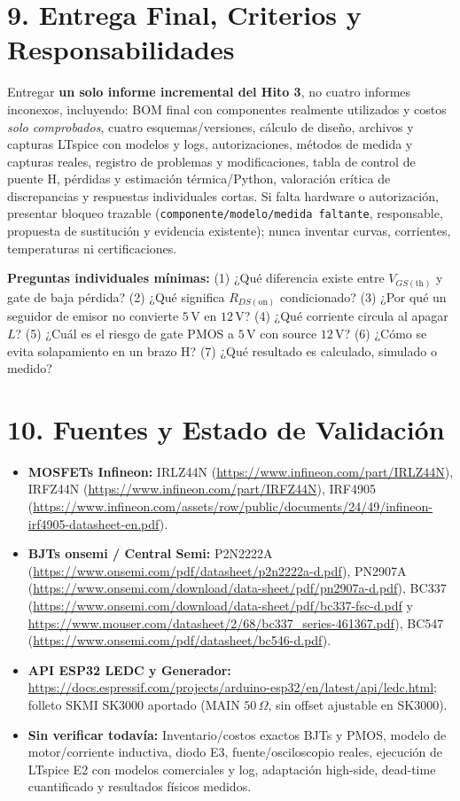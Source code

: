 \documentclass[10pt, a4paper, landscape]{article}
\begin{document}
\section*{9. Entrega Final, Criterios y Responsabilidades}
Entregar \textbf{un solo informe incremental del Hito 3}, no cuatro informes inconexos, incluyendo: BOM final con componentes realmente utilizados y costos \textit{solo comprobados}, cuatro esquemas/versiones, cálculo de diseño, archivos y capturas LTspice con modelos y logs, autorizaciones, métodos de medida y capturas reales, registro de problemas y modificaciones, tabla de control de puente H, pérdidas y estimación térmica/Python, valoración crítica de discrepancias y respuestas individuales cortas. Si falta hardware o autorización, presentar bloqueo trazable (\texttt{componente/modelo/medida faltante}, responsable, propuesta de sustitución y evidencia existente); nunca inventar curvas, corrientes, temperaturas ni certificaciones.

\noindent\textbf{Preguntas individuales mínimas:} (1) ¿Qué diferencia existe entre $V_{GS(\text{th})}$ y gate de baja pérdida? (2) ¿Qué significa $R_{DS(\text{on})}$ condicionado? (3) ¿Por qué un seguidor de emisor no convierte $5\,\text{V}$ en $12\,\text{V}$? (4) ¿Qué corriente circula al apagar $L$? (5) ¿Cuál es el riesgo de gate PMOS a $5\,\text{V}$ con source $12\,\text{V}$? (6) ¿Cómo se evita solapamiento en un brazo H? (7) ¿Qué resultado es calculado, simulado o medido?

\section*{10. Fuentes y Estado de Validación}
\begin{itemize}[noitemsep, topsep=2pt]
    \item \textbf{MOSFETs Infineon:} IRLZ44N (\url{https://www.infineon.com/part/IRLZ44N}), IRFZ44N (\url{https://www.infineon.com/part/IRFZ44N}), IRF4905 (\url{https://www.infineon.com/assets/row/public/documents/24/49/infineon-irf4905-datasheet-en.pdf}).
    \item \textbf{BJTs onsemi / Central Semi:} P2N2222A (\url{https://www.onsemi.com/pdf/datasheet/p2n2222a-d.pdf}), PN2907A (\url{https://www.onsemi.com/download/data-sheet/pdf/pn2907a-d.pdf}), BC337 (\url{https://www.onsemi.com/download/data-sheet/pdf/bc337-fsc-d.pdf} y \url{https://www.mouser.com/datasheet/2/68/bc337_series-461367.pdf}), BC547 (\url{https://www.onsemi.com/pdf/datasheet/bc546-d.pdf}).
    \item \textbf{API ESP32 LEDC y Generador:} \url{https://docs.espressif.com/projects/arduino-esp32/en/latest/api/ledc.html}; folleto SKMI SK3000 aportado (MAIN $50\,\Omega$, sin offset ajustable en SK3000).
    \item \textbf{Sin verificar todavía:} Inventario/costos exactos BJTs y PMOS, modelo de motor/corriente inductiva, diodo E3, fuente/osciloscopio reales, ejecución de LTspice E2 con modelos comerciales y log, adaptación high-side, dead-time cuantificado y resultados físicos medidos.
\end{itemize}
\end{document}
